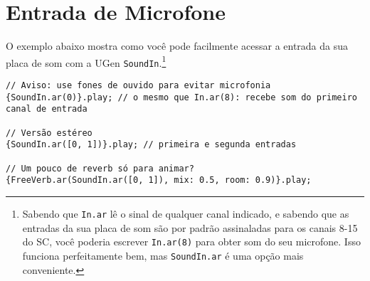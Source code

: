 \section{Entrada de Microfone}

O exemplo abaixo mostra como você pode facilmente acessar a entrada da sua placa de som com a UGen \texttt{SoundIn}.\footnote{Sabendo que \texttt{In.ar} lê o sinal de qualquer canal indicado, e sabendo que as entradas da sua placa de som são por padrão assinaladas para os canais 8-15 do SC, você poderia escrever \texttt{In.ar(8)} para obter som do seu microfone. Isso funciona perfeitamente bem, mas \texttt{SoundIn.ar} é uma opção mais conveniente.}

\begin{lstlisting}[style=SuperCollider-IDE, basicstyle=\scttfamily\footnotesize]
// Aviso: use fones de ouvido para evitar microfonia
{SoundIn.ar(0)}.play; // o mesmo que In.ar(8): recebe som do primeiro canal de entrada

// Versão estéreo
{SoundIn.ar([0, 1])}.play; // primeira e segunda entradas

// Um pouco de reverb só para animar?
{FreeVerb.ar(SoundIn.ar([0, 1]), mix: 0.5, room: 0.9)}.play;
\end{lstlisting}
